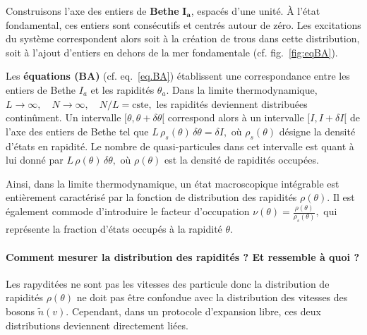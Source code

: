 Construisons l’axe des entiers de {\bf \textsf{Bethe}} $\boldsymbol{I_a}$,
espacés d’une unité. À l’état fondamental, ces entiers sont consécutifs et
centrés autour de zéro. Les excitations du système correspondent alors soit à
la création de trous dans cette distribution, soit à l’ajout d’entiers en
dehors de la mer fondamentale (cf. fig.~\ref{fig:eqBA}).

\smallskip

Les {\bf équations \textsf{(BA)}} (cf. eq.~\eqref{eq.BA}) établissent une
correspondance entre les entiers de Bethe $I_a$ et les rapidités $\theta_a$.
Dans la limite thermodynamique, \( L \to \infty, \quad N \to \infty, \quad N/L
= \text{cste}, \) les rapidités deviennent distribuées continûment. Un
intervalle $[\theta,\theta+\delta\theta[$ correspond alors à un intervalle
$[I,I+\delta I[$ de l’axe des entiers de Bethe tel que \(
L\,\rho_s(\theta)\,\delta\theta = \delta I, \) où $\rho_s(\theta)$ désigne la
densité d’états en rapidité. Le nombre de quasi-particules dans cet intervalle
est quant à lui donné par \( L\,\rho(\theta)\,\delta\theta, \) où
$\rho(\theta)$ est la densité de rapidités occupées.

\smallskip

Ainsi, dans la limite thermodynamique, un état macroscopique intégrable est
entièrement caractérisé par la fonction de distribution des rapidités
$\rho(\theta)$. Il est également commode d’introduire le facteur d’occupation
\( \nu(\theta)=\frac{\rho(\theta)}{\rho_s(\theta)}, \) qui représente la
fraction d’états occupés à la rapidité $\theta$.

\paragraph{Comment mesurer la distribution des rapidités ? Et ressemble à quoi ?}

Les rapyditées ne sont pas les vitesses des particule donc la distribution de
rapidités $\rho(\theta)$ ne doit pas être confondue avec la distribution des
vitesses des bosons $\tilde n(v)$. Cependant, dans un protocole d’expansion
libre, ces deux distributions deviennent directement liées.


